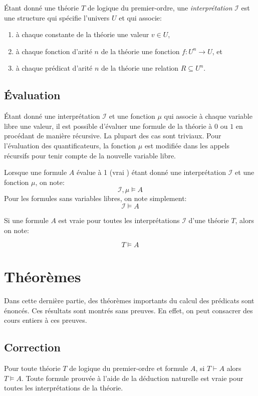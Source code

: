 Étant donné une théorie $T$ de logique du premier-ordre, une \og \textit{interprétation} \fg{} $\mathcal{I}$ est une structure qui spécifie l'univers $U$ et qui associe:
\begin{enumerate}
\item à chaque constante de la théorie une valeur $v \in U$,
\item à chaque fonction d'arité $n$ de la théorie une fonction $f : U^n \to U$, et
\item à chaque prédicat d'arité $n$ de la théorie une relation $R \subseteq U^n$.
\end{enumerate}

\subsection{Évaluation}

Étant donné une interprétation $\mathcal{I}$ et une fonction $\mu$ qui associe à chaque variable libre une valeur, il est possible d'évaluer une formule de la théorie à $0$ ou $1$ en procédant de manière récursive.
La plupart des cas sont triviaux. Pour l'évaluation des quantificateurs, la fonction $\mu$ est modifiée dans les appels récursifs pour tenir compte de la nouvelle variable libre.

Lorsque une formule $A$ évalue à 1 (\og vrai \fg{}) étant donné une interprétation $\mathcal{I}$ et une fonction $\mu$, on note:
\[
\mathcal{I}, \mu \vDash A
\]
Pour les formules sans variables libres, on note simplement:
\[
\mathcal{I} \vDash A
\]

Si une formule $A$ est vraie pour toutes les interprétations $\mathcal{I}$ d'une théorie $T$, alors on note:

\[
T \vDash A
\]

\section{Théorèmes}

Dans cette dernière partie, des théorèmes importants du calcul des prédicats sont énoncés.
Ces résultats sont montrés sans preuves.
En effet, on peut consacrer des cours entiers à ces preuves.

\subsection{Correction}

Pour toute théorie $T$ de logique du premier-ordre et formule $A$, si $T \vdash A$ alors $T \vDash A$.
Toute formule prouvée à l'aide de la déduction naturelle est vraie pour toutes les interprétations de la théorie.


